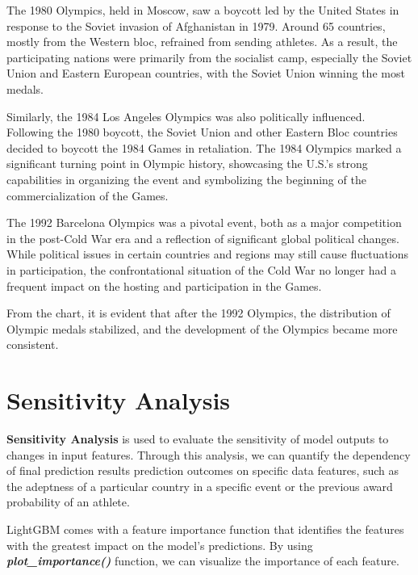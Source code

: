 \documentclass[12pt]{article}  %
\begin{document}
The 1980 Olympics, held in Moscow, saw a boycott led by the United States in response to the Soviet invasion of Afghanistan in 1979. Around 65 countries, mostly from the Western bloc, refrained from sending athletes. As a result, the participating nations were primarily from the socialist camp, especially the Soviet Union and Eastern European countries, with the Soviet Union winning the most medals.

Similarly, the 1984 Los Angeles Olympics was also politically influenced. Following the 1980 boycott, the Soviet Union and other Eastern Bloc countries decided to boycott the 1984 Games in retaliation. The 1984 Olympics marked a significant turning point in Olympic history, showcasing the U.S.'s strong capabilities in organizing the event and symbolizing the beginning of the commercialization of the Games.

The 1992 Barcelona Olympics was a pivotal event, both as a major competition in the post-Cold War era and a reflection of significant global political changes. While political issues in certain countries and regions may still cause fluctuations in participation, the confrontational situation of the Cold War no longer had a frequent impact on the hosting and participation in the Games.

From the chart, it is evident that after the 1992 Olympics, the distribution of Olympic medals stabilized, and the development of the Olympics became more consistent.



\section{Sensitivity Analysis}

\textbf{Sensitivity Analysis} is used to evaluate the sensitivity of model outputs to changes in input features. Through this analysis, we can quantify the dependency of final prediction results prediction outcomes on specific data features, such as the adeptness of a particular country in a specific event or the previous award probability of an athlete.

LightGBM comes with a feature importance function that identifies the features with the greatest impact on the model’s predictions. By using \textbf{\textit{plot\_importance()}} function, we can visualize the importance of each feature.
\end{document}
